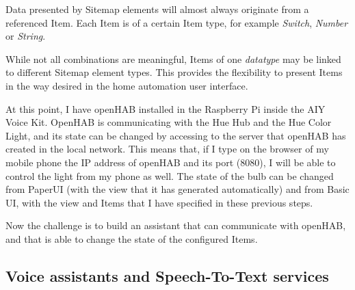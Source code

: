Data presented by Sitemap elements will almost always originate from a referenced Item. Each Item is of a certain Item type, for 
example \textit{Switch}, \textit{Number} or \textit{String}.

While not all combinations are meaningful, Items of one \textit{datatype} may be linked to different Sitemap element types. This 
provides the flexibility to present Items in the way desired in the home automation user interface.

\bigskip
At this point, I have openHAB installed in the Raspberry Pi inside the AIY Voice Kit. OpenHAB is communicating with the Hue Hub and
the Hue Color Light, and its state can be changed by accessing to the server that openHAB has created in the local network. This means
that, if I type on the browser of my mobile phone the IP address of openHAB and its port (8080), I will be able to control the light from
my phone as well. The state of the bulb can be changed from PaperUI (with the view that it has generated automatically) and from 
Basic UI, with the view and Items that I have specified in these previous steps.

Now the challenge is to build an assistant that can communicate with openHAB, and that is able to change the state of the configured
Items.

\subsection{Voice assistants and Speech-To-Text services}


